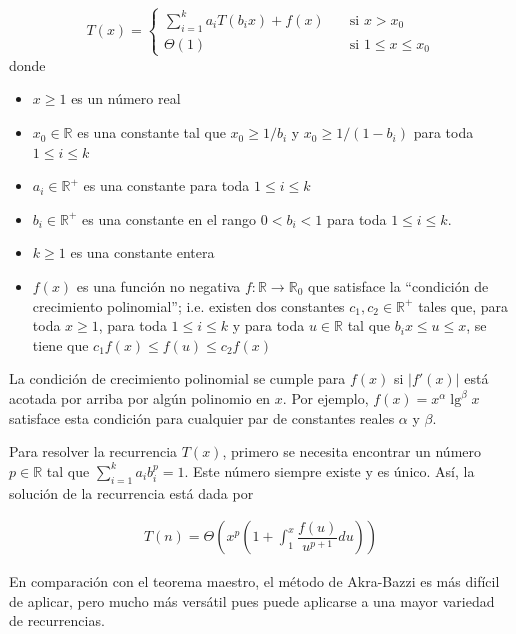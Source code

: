$$
T(x)=
\begin{cases}
    \sum_{i=1}^{k}a_iT(b_ix)+f(x) &\quad \text{si }x>x_0 \\
    \Theta(1) &\quad \text{si }1\leq x \leq x_0
\end{cases}
$$
donde
\begin{itemize}
    \item $x\geq 1$ es un número real
    \item $x_0\in\mathbb{R}$ es una constante tal que $x_0\geq 1/b_i$ y $x_0\geq 1/(1-b_i)$
    para toda $1\leq i\leq k$
    \item $a_i\in\mathbb{R^+}$ es una constante para toda $1\leq i\leq k$
    \item $b_i\in\mathbb{R^+}$ es una constante en el rango $0<b_i<1$ para toda $1\leq i\leq k$.
    \item $k\geq 1$ es una constante entera
    \item $f(x)$ es una función no negativa $f:\mathbb{R}\to\mathbb{R}_0$ que satisface
    la ``condición de crecimiento polinomial''; i.e. existen dos constantes $c_1,c_2\in\mathbb{R^+}$
    tales que, para toda $x\geq 1$, para toda $1\leq i\leq k$ y para toda $u\in\mathbb{R}$
    tal que $b_ix\leq u \leq x$, se tiene que $c_1f(x)\leq f(u)\leq c_2f(x)$
\end{itemize}
La condición de crecimiento polinomial se cumple para $f(x)$ si $|f'(x)|$ está acotada por
arriba por algún polinomio en $x$. Por ejemplo, $f(x)=x^\alpha\lg^\beta{x}$ satisface esta
condición para cualquier par de constantes reales $\alpha$ y $\beta$.

Para resolver la recurrencia $T(x)$, primero se necesita encontrar un número $p\in\mathbb{R}$
tal que $\sum_{i=1}^{k}a_ib_i^p=1$. Este número siempre existe y es único. Así, la solución
de la recurrencia está dada por

\begin{align*}
    T(n)=\Theta\left( x^p \left( 1 + \int_1^x \dfrac{f(u)}{u^{p+1}}du \right) \right)
\end{align*}

En comparación con el teorema maestro, el método de Akra-Bazzi es más difícil de 
aplicar, pero mucho más versátil pues puede aplicarse a una mayor variedad de
recurrencias.

